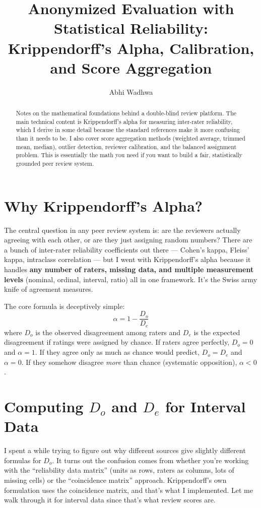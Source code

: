 \documentclass[11pt]{article}
\title{Anonymized Evaluation with Statistical Reliability:\\Krippendorff's Alpha, Calibration, and Score Aggregation}
\author{Abhi Wadhwa}
\date{}
\begin{document}
\maketitle

\begin{abstract}
Notes on the mathematical foundations behind a double-blind review platform. The main technical content is Krippendorff's alpha for measuring inter-rater reliability, which I derive in some detail because the standard references make it more confusing than it needs to be. I also cover score aggregation methods (weighted average, trimmed mean, median), outlier detection, reviewer calibration, and the balanced assignment problem. This is essentially the math you need if you want to build a fair, statistically grounded peer review system.
\end{abstract}

\section{Why Krippendorff's Alpha?}

The central question in any peer review system is: are the reviewers actually agreeing with each other, or are they just assigning random numbers? There are a bunch of inter-rater reliability coefficients out there --- Cohen's kappa, Fleiss' kappa, intraclass correlation --- but I went with Krippendorff's alpha because it handles \textbf{any number of raters, missing data, and multiple measurement levels} (nominal, ordinal, interval, ratio) all in one framework. It's the Swiss army knife of agreement measures.

The core formula is deceptively simple:
\[
    \alpha = 1 - \frac{D_o}{D_e}
\]
where $D_o$ is the observed disagreement among raters and $D_e$ is the expected disagreement if ratings were assigned by chance. If raters agree perfectly, $D_o = 0$ and $\alpha = 1$. If they agree only as much as chance would predict, $D_o = D_e$ and $\alpha = 0$. If they somehow disagree \textit{more} than chance (systematic opposition), $\alpha < 0$.

\section{Computing $D_o$ and $D_e$ for Interval Data}

I spent a while trying to figure out why different sources give slightly different formulas for $D_o$. It turns out the confusion comes from whether you're working with the ``reliability data matrix'' (units as rows, raters as columns, lots of missing cells) or the ``coincidence matrix'' approach. Krippendorff's own formulation uses the coincidence matrix, and that's what I implemented. Let me walk through it for interval data since that's what review scores are.
\end{document}
